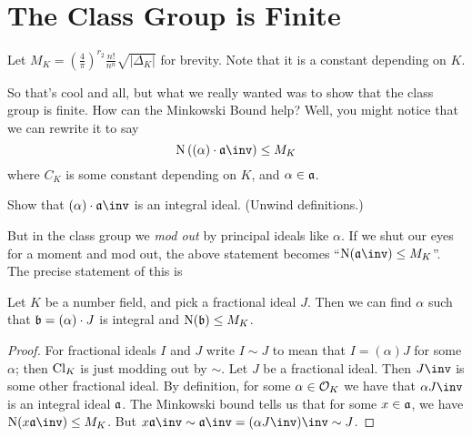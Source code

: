 \section{The Class Group is Finite}
\begin{definition}
	Let
	$M_K = \left( \frac 4\pi \right)^{r_2} \frac{n!}{n^n} \sqrt{\left\lvert \Delta_K \right\rvert}$
	for brevity.
	Note that it is a constant depending on $K$.
\end{definition}
So that's cool and all, but what we really wanted was to show that the class group is finite.
How can the Minkowski Bound help?
Well, you might notice that we can rewrite it to say
\[ \Norm\left( (\alpha) \cdot \aa\inv \right) \le M_K \]
where $C_K$ is some constant depending on $K$, and $\alpha \in \aa$.
\begin{ques}
	Show that $(\alpha) \cdot \aa\inv$ is an integral ideal.
	(Unwind definitions.)
\end{ques}
But in the class group we \emph{mod out} by principal ideals like $\alpha$.
If we shut our eyes for a moment and mod out, the above statement becomes ``$\Norm(\aa\inv)\le M_K$''.
The precise statement of this is
\begin{corollary}
	\label{cor:class_rep_minkowski}
	Let $K$ be a number field, and pick a fractional ideal $J$.
	Then we can find $\alpha$ such that $\bb = (\alpha) \cdot J$ is integral
	and $\Norm(\bb) \le M_K$.
\end{corollary}
\begin{proof}
	For fractional ideals $I$ and $J$ write $I \sim J$ to mean
	that $I = (\alpha)J$ for some $\alpha$; then $\Cl_K$ is just modding out by $\sim$.
	Let $J$ be a fractional ideal.
	Then $J\inv$ is some other fractional ideal.
	By definition, for some $\alpha \in \OO_K$ we have that $\alpha J\inv$ is an integral ideal $\aa$.
	The Minkowski bound tells us that for some $x \in \aa$, we have $\Norm(x\aa\inv) \le M_K$.
	But $x\aa\inv \sim \aa\inv = (\alpha J\inv)\inv \sim J$.
\end{proof}

